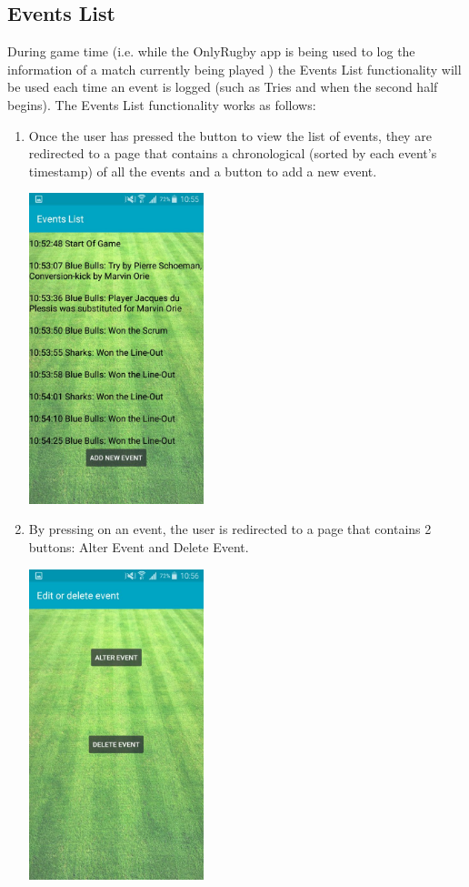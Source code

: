 \documentclass[hidelinks,a4paper,12pt]{article}
\begin{document}
\subsection{ Events List}
		During game time (i.e. while the OnlyRugby app is being used to log the information of a match currently being played ) the Events List functionality will be used each time an event is logged (such as Tries and when the second half begins). The Events List functionality works as follows:
		\begin{enumerate}
			\item Once the user has pressed the button to view the list of events, they are redirected to a page that contains a chronological (sorted by each event's timestamp) of all the events and a button to add a new event.

			\begin{center}
  				 \includegraphics[width=0.4\textwidth] {./images/eventslist.jpg}\\[0.4cm]
			\end{center}

			\item By pressing on an event, the user is redirected to a page that contains 2 buttons: Alter Event and Delete Event.

			\begin{center}
  				 \includegraphics[width=0.4\textwidth] {./images/alter_and_delete.jpg}\\[0.4cm]
			\end{center}


\end{enumerate}
\end{document}
